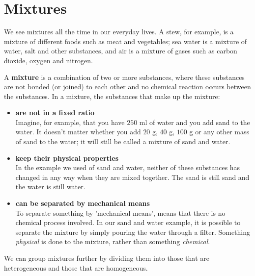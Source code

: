 \label{m38708*cid2}
            \section{Mixtures}
            \nopagebreak
            \label{m38708*id62584}We see mixtures all the time in our everyday lives. A stew, for example, is a mixture of different foods such as meat and vegetables; sea water is a mixture of water, salt and other substances, and air is a mixture of gases such as carbon dioxide, oxygen and nitrogen.\par 
\label{m38708*fhsst!!!underscore!!!id69}
 {\label{m38708*meaningfhsst!!!underscore!!!id69}
      A \textbf{mixture} is a combination of two or more substances, where these substances are not bonded (or joined) to each other and no chemical reaction occurs between the substances. 
       } 
      \label{m38708*id62612}In a mixture, the substances that make up the mixture:\par 
      \label{m38708*id62615}\begin{itemize}[noitemsep]
            \label{m38708*uid2}\item \textbf{are not in a fixed ratio} \\
Imagine, for example, that you have $250$ ml of water and you add sand to the water. It doesn't matter whether you add $20$ g, $40$ g, $100$ g or any other mass of sand to the water; it will still be called a mixture of sand and water.
\label{m38708*uid3}\item \textbf{keep their physical properties} \\
In the example we used of sand and water, neither of these substances has changed in any way when they are mixed together. The sand is still sand and the water is still water.
\label{m38708*uid4}\item \textbf{can be separated by mechanical means} \\
To separate something by 'mechanical means', means that there is no chemical process involved. In our sand and water example, it is possible to separate the mixture by simply pouring the water through a filter. Something \textsl{physical} is done to the mixture, rather than something \textsl{chemical}.
\end{itemize}
      \label{m38708*id62700}We can group mixtures further by dividing them into those that are heterogeneous and those that are homogeneous.\par 

      \label{m38708*uid5}
